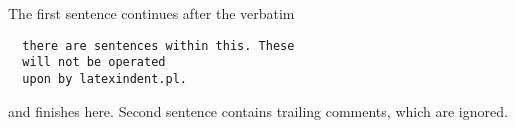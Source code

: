 The first sentence continues after the verbatim
\begin{verbatim}
  there are sentences within this. These 
  will not be operated
  upon by latexindent.pl. 
\end{verbatim}
and finishes here. Second sentence %
contains trailing comments,
which are ignored.
